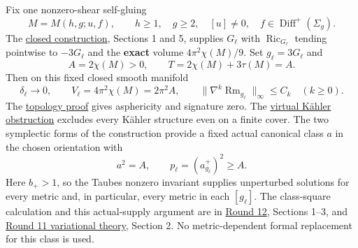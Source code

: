 \documentclass[
  11pt,
]{article}
\begin{document}
Fix one nonzero-shear self-gluing \[
 M=M(h,g;u,f),\qquad h\ge1,\quad g\ge2,\quad [u]\ne0,
 \quad f\in\operatorname{Diff}^+(\Sigma_g).
 \tag{25}
\] The \href{../mathematics/current/round11_closed_gluing.md}{closed
construction}, Sections 1 and 5, supplies \(G_\ell\) with
\(\operatorname{Ric}_{G_\ell}\) tending pointwise to \(-3G_\ell\) and
the \textbf{exact} volume \(4\pi^2\chi(M)/9\). Set \(g_\ell=3G_\ell\)
and \[
 A=2\chi(M)>0,\qquad T=2\chi(M)+3\tau(M)=A.
\] Then on this fixed closed smooth manifold \[
 \delta_\ell\longrightarrow0,
 \qquad V_\ell=4\pi^2\chi(M)=2\pi^2A,
 \qquad\|\nabla^k\operatorname{Rm}_{g_\ell}\|_\infty\le C_k
                           \quad(k\ge0).
 \tag{26}
\] The \href{../mathematics/current/round11_graph_topology.md}{topology
proof} gives asphericity and signature zero. The
\href{../mathematics/current/round11_kahler.md}{virtual Kähler
obstruction} excludes every Kähler structure even on a finite cover. The
two symplectic forms of the construction provide a fixed actual
canonical class \(a\) in the chosen orientation with \[
                  a^2=A,\qquad p_\ell=(a_{g_\ell}^+)^2\ge A.
 \tag{27}
\] Here \(b_+>1\), so the Taubes nonzero invariant supplies unperturbed
solutions for every metric and, in particular, every metric in each
\([g_\ell]\). The class-square calculation and this actual-supply
argument are in \href{../mathematics/current/round12_global.md}{Round
12}, Sections 1--3, and
\href{../mathematics/current/round11_variational.md}{Round 11
variational theory}, Section 2. No metric-dependent formal replacement
for this class is used.
\end{document}
